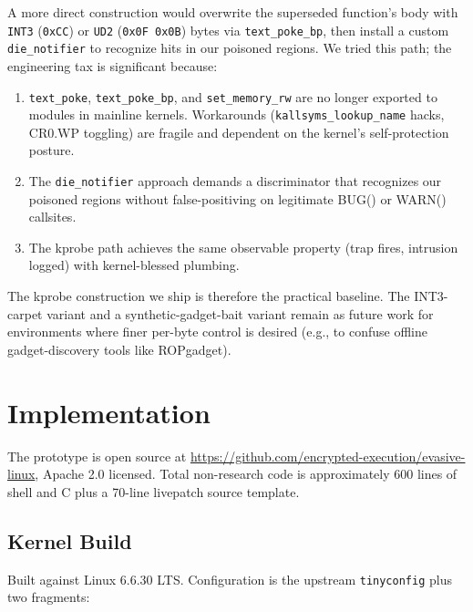 \documentclass[10pt,letterpaper]{article}
\begin{document}
A more direct construction would overwrite the superseded function's
body with \texttt{INT3} (\texttt{0xCC}) or \texttt{UD2}
(\texttt{0x0F 0x0B}) bytes via \texttt{text\_poke\_bp}, then install
a custom \texttt{die\_notifier} to recognize hits in our poisoned
regions. We tried this path; the engineering tax is significant
because:

\begin{enumerate}[leftmargin=*]
\item \texttt{text\_poke}, \texttt{text\_poke\_bp}, and
\texttt{set\_memory\_rw} are no longer exported to modules in
mainline kernels. Workarounds (\texttt{kallsyms\_lookup\_name}
hacks, CR0.WP toggling) are fragile and dependent on the kernel's
self-protection posture.
\item The \texttt{die\_notifier} approach demands a discriminator
that recognizes our poisoned regions without false-positiving on
legitimate BUG() or WARN() callsites.
\item The kprobe path achieves the same observable property (trap
fires, intrusion logged) with kernel-blessed plumbing.
\end{enumerate}

The kprobe construction we ship is therefore the practical baseline.
The INT3-carpet variant and a synthetic-gadget-bait variant remain
as future work for environments where finer per-byte control is
desired (e.g., to confuse offline gadget-discovery tools like
ROPgadget).

\section{Implementation}
\label{sec:impl}

The prototype is open source at
\url{https://github.com/encrypted-execution/evasive-linux}, Apache
2.0 licensed. Total non-research code is approximately 600 lines of
shell and C plus a 70-line livepatch source template.

\subsection{Kernel Build}

Built against Linux 6.6.30 LTS. Configuration is the upstream
\texttt{tinyconfig} plus two fragments:
\end{document}
